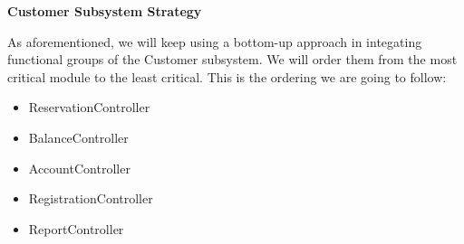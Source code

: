 \begin{large}
\textbf{Customer Subsystem Strategy}
\end{large}

As aforementioned, we will keep using a bottom-up approach in integating functional groups of the Customer subsystem. We will order them from the most critical module to the least critical. This is the ordering we are going to follow:
\begin{itemize}
\item ReservationController
\item BalanceController
\item AccountController
\item RegistrationController
\item ReportController
\end{itemize}










